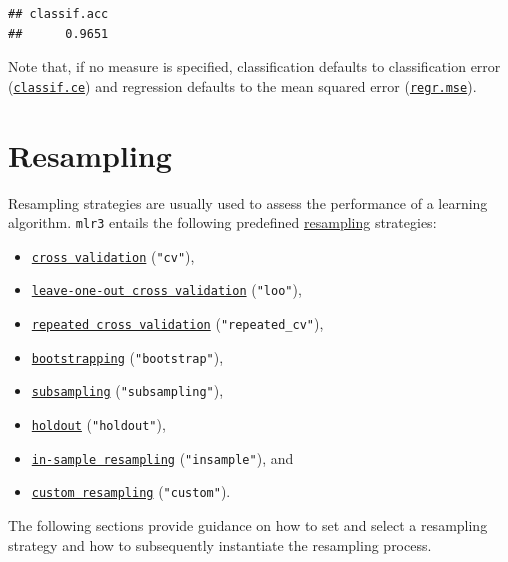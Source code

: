 \documentclass[
]{scrbook}
\providecommand{\tightlist}{%
  \setlength{\itemsep}{0pt}\setlength{\parskip}{0pt}}
\begin{document}
\begin{verbatim}
## classif.acc 
##      0.9651
\end{verbatim}

Note that, if no measure is specified, classification defaults to classification error (\href{https://mlr3.mlr-org.com/reference/mlr_measures_classif.ce.html}{\texttt{classif.ce}}) and regression defaults to the mean squared error (\href{https://mlr3.mlr-org.com/reference/mlr_measures_regr.mse.html}{\texttt{regr.mse}}).

\hypertarget{resampling}{%
\section{Resampling}\label{resampling}}

Resampling strategies are usually used to assess the performance of a learning algorithm.
\texttt{mlr3} entails the following predefined \protect\hyperlink{resampling}{resampling} strategies:

\begin{itemize}
\tightlist
\item
  \href{https://mlr3.mlr-org.com/reference/mlr_resamplings_cv.html}{\texttt{cross\ validation}} (\texttt{"cv"}),
\item
  \href{https://mlr3.mlr-org.com/reference/mlr_resamplings_loo.html}{\texttt{leave-one-out\ cross\ validation}} (\texttt{"loo"}),
\item
  \href{https://mlr3.mlr-org.com/reference/mlr_resamplings_repeated_cv.html}{\texttt{repeated\ cross\ validation}} (\texttt{"repeated\_cv"}),
\item
  \href{https://mlr3.mlr-org.com/reference/mlr_resamplings_bootstrap.html}{\texttt{bootstrapping}} (\texttt{"bootstrap"}),
\item
  \href{https://mlr3.mlr-org.com/reference/mlr_resamplings_subsampling.html}{\texttt{subsampling}} (\texttt{"subsampling"}),
\item
  \href{https://mlr3.mlr-org.com/reference/mlr_resamplings_holdout.html}{\texttt{holdout}} (\texttt{"holdout"}),
\item
  \href{https://mlr3.mlr-org.com/reference/mlr_resamplings_insample.html}{\texttt{in-sample\ resampling}} (\texttt{"insample"}), and
\item
  \href{https://mlr3.mlr-org.com/reference/mlr_resamplings_custom.html}{\texttt{custom\ resampling}} (\texttt{"custom"}).
\end{itemize}

The following sections provide guidance on how to set and select a resampling strategy and how to subsequently instantiate the resampling process.
\end{document}
